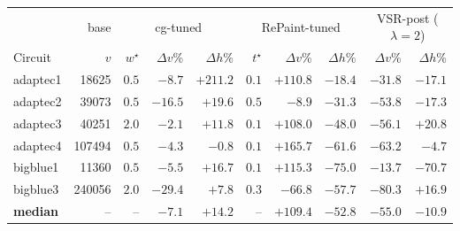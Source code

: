 \begin{tabular}{lr|rrr|rrr|rr}
\toprule
& base & \multicolumn{3}{c|}{cg-tuned} & \multicolumn{3}{c|}{RePaint-tuned} & \multicolumn{2}{c}{VSR-post ($\lambda{=}2$)} \\
Circuit & $v$ & $w^\star$ & $\Delta v$\% & $\Delta h$\% & $t^\star$ & $\Delta v$\% & $\Delta h$\% & $\Delta v$\% & $\Delta h$\% \\
\midrule
adaptec1 & 18625 & $0.5$ & $-8.7$ & $+211.2$ & $0.1$ & $+110.8$ & $-18.4$ & $-31.8$ & $-17.1$ \\
adaptec2 & 39073 & $0.5$ & $-16.5$ & $+19.6$ & $0.5$ & $-8.9$ & $-31.3$ & $-53.8$ & $-17.3$ \\
adaptec3 & 40251 & $2.0$ & $-2.1$ & $+11.8$ & $0.1$ & $+108.0$ & $-48.0$ & $-56.1$ & $+20.8$ \\
adaptec4 & 107494 & $0.5$ & $-4.3$ & $-0.8$ & $0.1$ & $+165.7$ & $-61.6$ & $-63.2$ & $-4.7$ \\
bigblue1 & 11360 & $0.5$ & $-5.5$ & $+16.7$ & $0.1$ & $+115.3$ & $-75.0$ & $-13.7$ & $-70.7$ \\
bigblue3 & 240056 & $2.0$ & $-29.4$ & $+7.8$ & $0.3$ & $-66.8$ & $-57.7$ & $-80.3$ & $+16.9$ \\
\midrule
\textbf{median} & -- & -- & $-7.1$ & $+14.2$ & -- & $+109.4$ & $-52.8$ & $-55.0$ & $-10.9$ \\
\bottomrule
\end{tabular}
